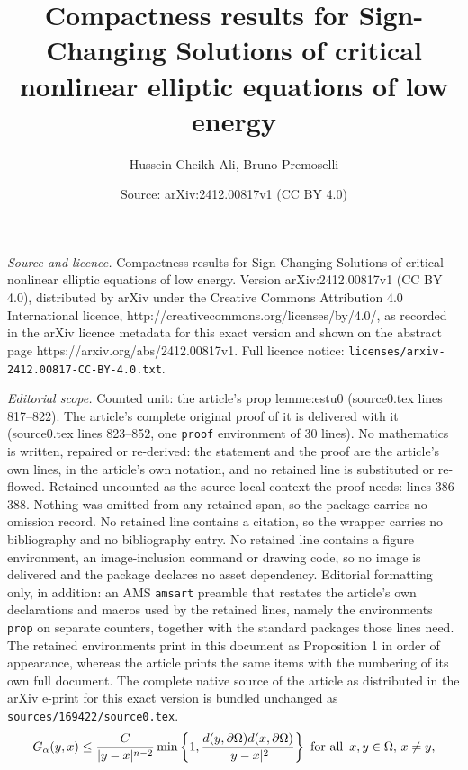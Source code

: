 \documentclass[10pt,a4paper]{amsart}
\title{Compactness results for Sign-Changing Solutions of critical nonlinear elliptic equations of low energy}
\author{Hussein Cheikh Ali, Bruno Premoselli}
\date{Source: arXiv:2412.00817v1 (CC BY 4.0)}
\newcommand{\Om}{\Omega}
\def \bb{\hbox}
\begin{document}
\maketitle

\noindent\emph{Source and licence.} Compactness results for Sign-Changing Solutions of critical nonlinear elliptic equations of low energy. Version arXiv:2412.00817v1 (CC BY 4.0), distributed by arXiv under the Creative Commons Attribution 4.0 International licence, http://creativecommons.org/licenses/by/4.0/, as recorded in the arXiv licence metadata for this exact version and shown on the abstract page https://arxiv.org/abs/2412.00817v1. Full licence notice: \texttt{licenses/arxiv-2412.00817-CC-BY-4.0.txt}.\par\smallskip

\noindent\textit{Editorial scope.} Counted unit: the article's prop lemme:estu0 (source0.tex lines 817--822). The article's complete original proof of it is delivered with it (source0.tex lines 823--852, one \texttt{proof} environment of 30 lines). No mathematics is written, repaired or re-derived: the statement and the proof are the article's own lines, in the article's own notation, and no retained line is substituted or re-flowed.  Retained uncounted as the source-local context the proof needs: lines 386--388.  Nothing was omitted from any retained span, so the package carries no omission record.  No retained line contains a citation, so the wrapper carries no bibliography and no bibliography entry.  No retained line contains a figure environment, an image-inclusion command or drawing code, so no image is delivered and the package declares no asset dependency.  Editorial formatting only, in addition: an AMS \texttt{amsart} preamble that restates the article's own declarations and macros used by the retained lines, namely the environments \texttt{prop} on separate counters, together with the standard packages those lines need.  The retained environments print in this document as Proposition 1 in order of appearance, whereas the article prints the same items with the numbering of its own full document.  The complete native source of the article as distributed in the arXiv e-print for this exact version is bundled unchanged as \texttt{sources/169422/source0.tex}.
\begin{equation}\label{estGlai}
	G_{\alpha}(y,x)\leq \frac{C}{|y-x|^{n-2}} \min\left\lbrace 1,\frac{d(y,\partial\Om)d(x,\partial\Om)}{|y-x|^2}\right\rbrace \bb{ for all }\, x,y \in \Om,\,  x\neq y,
\end{equation}
\end{document}
